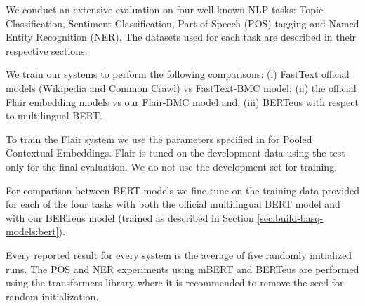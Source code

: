 \documentclass[10pt, a4paper]{article}
\begin{document}







We conduct an extensive evaluation on four well known NLP tasks: Topic Classification, Sentiment Classification, Part-of-Speech (POS) tagging and Named Entity Recognition (NER). The datasets used for each task are described in their respective sections.

We train our systems to perform the following comparisons: (i) FastText official models (Wikipedia and Common Crawl) vs FastText-BMC model; (ii) the official Flair embedding models vs our Flair-BMC model and, (iii) BERTeus with respect to multilingual BERT.

To train the Flair system we use the parameters specified in \cite{akbik2019naacl} for Pooled Contextual Embeddings. Flair is tuned on the development data using the test only for the final evaluation. We do not use the development set for training.

For comparison between BERT models we fine-tune on the training data provided for each of the four tasks with both the official multilingual BERT \cite{devlin2019bert} model and with our BERTeus model (trained as described in Section \ref{sec:build-basq-models:bert}).

Every reported result for every system is the average of five randomly initialized runs. The POS and NER experiments using mBERT and BERTeus are performed using the transformers library \cite{Wolf2019HuggingFacesTS} where it is recommended to remove the seed for random initialization.
\end{document}
